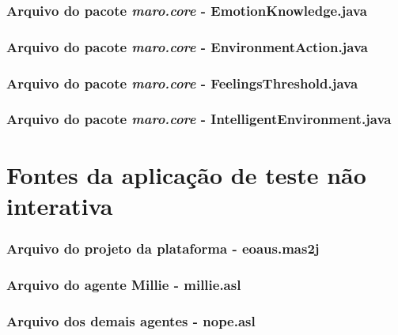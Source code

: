 \subsection*{ Arquivo do pacote \emph{maro.core} - EmotionKnowledge.java}


\subsection*{ Arquivo do pacote \emph{maro.core} - EnvironmentAction.java}


\subsection*{ Arquivo do pacote \emph{maro.core} - FeelingsThreshold.java}


\subsection*{ Arquivo do pacote \emph{maro.core} - IntelligentEnvironment.java}


\chapter{Fontes da aplicação de teste não interativa}
\subsection*{Arquivo do projeto da plataforma - eoaus.mas2j}


\subsection*{Arquivo do agente Millie - millie.asl}


\subsection*{Arquivo dos demais agentes - nope.asl}


